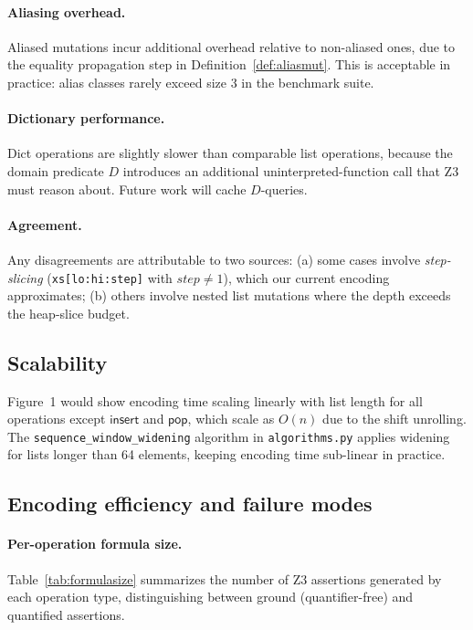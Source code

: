 \documentclass[11pt]{article}
\newcommand{\MutIns}{\ensuremath{\mathsf{insert}}}
\newcommand{\MutPop}{\ensuremath{\mathsf{pop}}}
\begin{document}
\paragraph{Aliasing overhead.}
Aliased mutations incur additional overhead relative to non-aliased ones,
due to the equality propagation step in Definition~\ref{def:aliasmut}.
This is acceptable in practice: alias classes rarely exceed size 3 in the
benchmark suite.

\paragraph{Dictionary performance.}
Dict operations are slightly slower than comparable list operations, because
the domain predicate $D$ introduces an additional uninterpreted-function
call that Z3 must reason about.  Future work will cache $D$-queries.

\paragraph{Agreement.}
Any disagreements are attributable to two sources: (a) some
cases involve \emph{step-slicing} (\texttt{xs[lo:hi:step]} with $\mathit{step}
\neq 1$), which our current encoding approximates; (b) others involve nested
list mutations where the depth exceeds the heap-slice budget.

\subsection{Scalability}

Figure~1 would show encoding time scaling linearly with list length for all
operations except \MutIns{} and \MutPop{}, which scale as $O(n)$ due to the
shift unrolling.  The \texttt{sequence\_window\_widening} algorithm in
\texttt{algorithms.py} applies widening for lists longer than 64 elements,
keeping encoding time sub-linear in practice.

\subsection{Encoding efficiency and failure modes}\label{sec:efficiency}

\paragraph{Per-operation formula size.}
Table~\ref{tab:formulasize} summarizes the number of Z3 assertions generated
by each operation type, distinguishing between ground (quantifier-free) and
quantified assertions.
\end{document}
